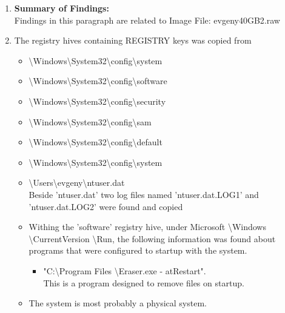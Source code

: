 \begin{enumerate}
\item \textbf{Summary of Findings:}\\
Findings in this paragraph are related to Image File: evgeny\textunderscore 40GB\textunderscore 2.raw

	\item The registry hives containing REGISTRY keys was copied from 
	\begin{itemize}
		\item \textbackslash Windows\textbackslash System32\textbackslash config\textbackslash system\\ 
		\item \textbackslash Windows\textbackslash System32\textbackslash config\textbackslash software\\
		\item \textbackslash Windows\textbackslash System32\textbackslash config\textbackslash security\\
		\item \textbackslash Windows\textbackslash System32\textbackslash config\textbackslash sam \\
		\item \textbackslash Windows\textbackslash System32\textbackslash config\textbackslash default \\
		\item \textbackslash Windows\textbackslash System32\textbackslash config\textbackslash system \\
		\item \textbackslash Users\textbackslash evgeny\textbackslash ntuser.dat \\
		Beside 'ntuser.dat' two log files named 'ntuser.dat.LOG1' and 'ntuser.dat.LOG2' were found and copied
		
		\item Withing the 'software' registry hive, under 
		Microsoft \textbackslash Windows \textbackslash CurrentVersion \textbackslash Run, the following information was found about programs that were configured to startup with the system.
		
		\begin{itemize}
			\item "C:\textbackslash Program Files \textbackslash Eraser.exe - atRestart".\\ This is a program designed to remove files on startup.
		\end{itemize}
		
		\item The system is most probably a physical system.
		

\end{itemize}
\end{enumerate}
